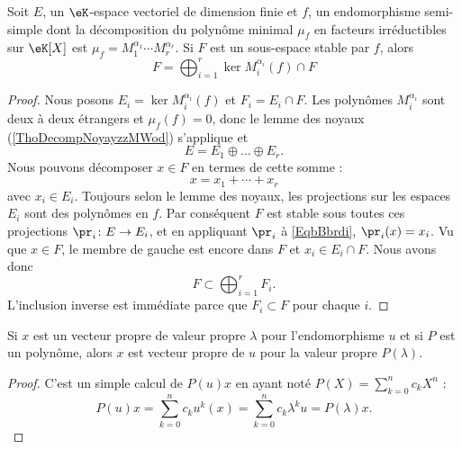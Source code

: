 \begin{corollary}   \label{CorKiSCkC}
    Soit \( E\), un \( \eK\)-espace vectoriel de dimension finie et \( f\), un endomorphisme semi-simple dont la décomposition du polynôme minimal \( \mu_f\) en facteurs irréductibles sur \( \eK[X]\) est \( \mu_f=M_1^{\alpha_1}\cdots M_r^{\alpha_r}\). Si \( F\) est un sous-espace stable par \( f\), alors
    \begin{equation}
        F=\bigoplus_{i=1}^r\ker M_i^{\alpha_i}(f)\cap F
    \end{equation}
\end{corollary}

\begin{proof}
    Nous posons \( E_i=\ker M_i^{\alpha_i}(f)\) et \( F_i=E_i\cap F\). Les polynômes \( M_i^{\alpha_i}\) sont deux à deux étrangers et \( \mu_f(f)=0\), donc le lemme des noyaux (\ref{ThoDecompNoyayzzMWod}) s'applique et
    \begin{equation}
        E=E_1\oplus\ldots\oplus E_r.
    \end{equation}
    Nous pouvons décomposer \( x\in F\) en termes de cette somme :
    \begin{equation}     \label{EqbBbrdi}
        x=x_1+\cdots +x_r
    \end{equation}
    avec \( x_i\in E_i\). Toujours selon le lemme des noyaux, les projections sur les espaces \( E_i\) sont des polynômes en \( f\). Par conséquent \( F\) est stable sous toutes ces projections \( \pr_i\colon E\to E_i\), et en appliquant \( \pr_i\) à \eqref{EqbBbrdi}, \( \pr_i(x)=x_i\). Vu que \( x\in F\), le membre de gauche est encore dans \( F\) et \( x_i\in E_i\cap F\). Nous avons donc
    \begin{equation}
        F\subset\bigoplus_{i=1}^rF_i.
    \end{equation}
    L'inclusion inverse est immédiate parce que \( F_i\subset F\) pour chaque \( i\).
\end{proof}

\begin{lemma}   \label{LemVISooHxMdbr}
    Si \( x\) est un vecteur propre de valeur propre \( \lambda\) pour l'endomorphisme \( u\) et si \( P\) est un polynôme, alors \( x\) est vecteur propre de \( u\) pour la valeur propre \( P(\lambda)\).
\end{lemma}

\begin{proof}
    C'est un simple calcul de \( P(u)x\) en ayant noté \( P(X)=\sum_{k=0}^nc_kX^n\) :
    \begin{equation}
        P(u)x=\sum_{k=0}^nc_ku^k(x)=\sum_{k=0}^nc_k\lambda^ku=P(\lambda)x.
    \end{equation}
\end{proof}

